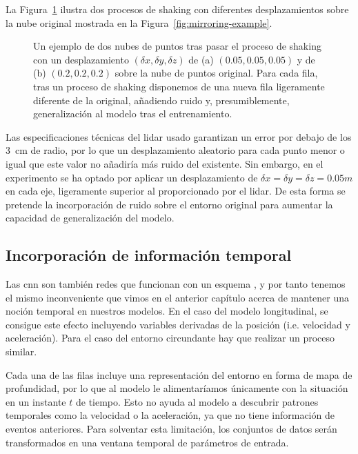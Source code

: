 La Figura~\ref{fig:shaking-example} ilustra dos procesos de shaking con diferentes desplazamientos sobre la nube original mostrada en la Figura~\ref{fig:mirroring-example}.

\begin{figure}
	\centering
	\qquad
	\caption[Ejemplo de la técnica de \textit{shaking}]{Un ejemplo de dos nubes de puntos tras pasar el proceso de shaking con un desplazamiento $(\delta x, \delta y, \delta z)$ de (a) $(0.05, 0.05, 0.05)$ y de (b) $(0.2, 0.2, 0.2)$ sobre la nube de puntos original. Para cada fila, tras un proceso de shaking disponemos de una nueva fila ligeramente diferente de la original, añadiendo ruido y, presumiblemente, generalización al modelo tras el entrenamiento.}
	\label{fig:shaking-example}
\end{figure}

Las especificaciones técnicas del \acrshort{lidar} usado garantizan un error por debajo de los \SI{3}{\cm} de radio, por lo que un desplazamiento aleatorio para cada punto menor o igual que este valor no añadiría más ruido del existente. Sin embargo, en el experimento se ha optado por aplicar un desplazamiento de $\delta x = \delta y = \delta z = 0.05m$ en cada eje, ligeramente superior al proporcionado por el \acrshort{lidar}. De esta forma se pretende la incorporación de ruido sobre el entorno original para aumentar la capacidad de generalización del modelo.

\subsection{Incorporación de información temporal}

Las \ac{cnn} son también redes que funcionan con un esquema \textit{}, y por tanto tenemos el mismo inconveniente que vimos en el anterior capítulo acerca de mantener una noción temporal en nuestros modelos. En el caso del modelo longitudinal, se consigue este efecto incluyendo variables derivadas de la posición (i.e. velocidad y aceleración). Para el caso del entorno circundante hay que realizar un proceso similar.

Cada una de las filas incluye una representación del entorno en forma de mapa de profundidad, por lo que al modelo le alimentaríamos únicamente con la situación en un instante $t$ de tiempo. Esto no ayuda al modelo a descubrir patrones temporales como la velocidad o la aceleración, ya que no tiene información de eventos anteriores. Para solventar esta limitación, los conjuntos de datos serán transformados en una ventana temporal de parámetros de entrada.

